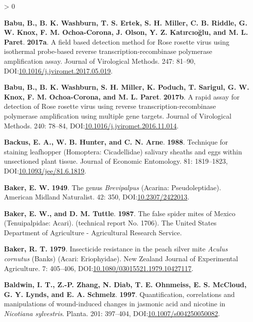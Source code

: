 \documentclass{ufdissertation}[overrideChapters] %
\newlength{\cslhangindent}
\newenvironment{CSLReferences}[2] %
 {%
  \setlength{\parindent}{0pt}
  \ifodd #1 \everypar{\setlength{\hangindent}{\cslhangindent}}\ignorespaces\fi
  \ifnum #2 > 0
  \setlength{\parskip}{#2\baselineskip}
  \fi
 }%
 {}
\begin{document}
{\begin{CSLReferences}{1}{1}
\leavevmode{}%
\textbf{Babu, B., B. K. Washburn, T. S. Ertek, S. H. Miller, C. B. Riddle, G. W. Knox, F. M. Ochoa-Corona, J. Olson, Y. Z. Katırcıoğlu, and M. L. Paret}. \textbf{2017a}. A field based detection method for {Rose rosette virus} using isothermal probe-based reverse transcription-recombinase polymerase amplification assay. Journal of Virological Methods. 247: 81--90, DOI:\href{https://doi.org/10.1016/j.jviromet.2017.05.019}{10.1016/j.jviromet.2017.05.019}.

\leavevmode{}%
\textbf{Babu, B., B. K. Washburn, S. H. Miller, K. Poduch, T. Sarigul, G. W. Knox, F. M. Ochoa-Corona, and M. L. Paret}. \textbf{2017b}. A rapid assay for detection of {Rose rosette virus} using reverse transcription-recombinase polymerase amplification using multiple gene targets. Journal of Virological Methods. 240: 78--84, DOI:\href{https://doi.org/10.1016/j.jviromet.2016.11.014}{10.1016/j.jviromet.2016.11.014}.

\leavevmode{}%
\textbf{Backus, E. A., W. B. Hunter, and C. N. Arne}. \textbf{1988}. Technique for staining leafhopper ({Homoptera}: {Cicadellidae}) salivary sheaths and eggs within unsectioned plant tissue. Journal of Economic Entomology. 81: 1819--1823, DOI:\href{https://doi.org/10.1093/jee/81.6.1819}{10.1093/jee/81.6.1819}.

\leavevmode{}%
\textbf{Baker, E. W.} \textbf{1949}. The genus {\emph{Brevipalpus}} ({Acarina}: {Pseudoleptidae}). American Midland Naturalist. 42: 350, DOI:\href{https://doi.org/10.2307/2422013}{10.2307/2422013}.

\leavevmode{}%
\textbf{Baker, E. W., and D. M. Tuttle}. \textbf{1987}. The false spider mites of {Mexico} ({Tenuipalpidae}: {Acari}). (technical report No. 1706). The {United States} Department of Agriculture - Agricultural Research Service.

\leavevmode{}%
\textbf{Baker, R. T.} \textbf{1979}. Insecticide resistance in the peach silver mite {\emph{Aculus cornutus}} {(Banks)} ({Acari}: {Eriophyidae}). New Zealand Journal of Experimental Agriculture. 7: 405--406, DOI:\href{https://doi.org/10.1080/03015521.1979.10427117}{10.1080/03015521.1979.10427117}.

\leavevmode{}%
\textbf{Baldwin, I. T., Z.-P. Zhang, N. Diab, T. E. Ohnmeiss, E. S. McCloud, G. Y. Lynds, and E. A. Schmelz}. \textbf{1997}. Quantification, correlations and manipulations of wound-induced changes in jasmonic acid and nicotine in {\emph{Nicotiana sylvestris}}. Planta. 201: 397--404, DOI:\href{https://doi.org/10.1007/s004250050082}{10.1007/s004250050082}.


\end{CSLReferences}}
\end{document}
